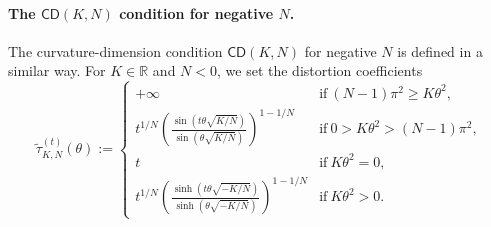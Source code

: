 \documentclass[11pt,twoside,a4paper]{article}
\newcommand{\R}{\mathbb{R}}
\newcommand{\cd}{\mathsf{CD}}
\theoremstyle{theorem}
\theoremstyle{definition}
\theoremstyle{remark}
\theoremstyle{proof}
\begin{document}

\paragraph{The \texorpdfstring{$\cd(K,N)$}{CD(K, N)} condition for negative \texorpdfstring{$N$}{N}.}
The curvature-dimension condition $\cd(K,N)$ for negative $N$ is defined in a similar way.
For $K\in\R$ and $N<0$,
 we set the distortion coefficients
\begin{equation*}
\tilde{\tau}_{K,N}^{(t)}(\theta):=
%
\begin{cases}

%
\displaystyle  +\infty & \textrm{if}\  (N-1)\pi^{2}\geq K\theta^{2},\\
%
\displaystyle t^{1/N}\left(\frac{\sin(t\theta\sqrt{K/N})}{\sin(\theta\sqrt{K/N})}\right)^{1-1/N} & \textrm{if}\  0>K\theta^{2} > (N-1)\pi^{2},\\
%
t & \textrm{if}\ %
K\theta^2 =0, \\
%
\displaystyle  t^{1/N}\left(\frac{\sinh(t\theta\sqrt{-K/N})}{\sinh(\theta\sqrt{-K/N})}\right)^{1-1/N} & \textrm{if}\ K\theta^2 > 0.
%
\end{cases}
\end{equation*}
\end{document}
